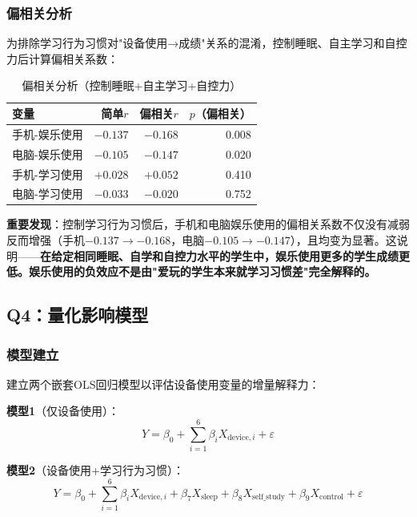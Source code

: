 \documentclass[11pt]{ctexart}
\begin{document}
\subsubsection{偏相关分析}

为排除学习行为习惯对"设备使用→成绩"关系的混淆，控制睡眠、自主学习和自控力后计算偏相关系数：

\begin{table}[H]
\centering
\caption{偏相关分析（控制睡眠+自主学习+自控力）}
\label{tab:partial}
\begin{tabular}{lrrr}
\toprule
变量 & 简单$r$ & 偏相关$r$ & $p$（偏相关）\\
\midrule
手机-娱乐使用 & $-0.137$ & $\mathbf{-0.168}$ & 0.008 \\
电脑-娱乐使用 & $-0.105$ & $\mathbf{-0.147}$ & 0.020 \\
手机-学习使用 & $+0.028$ & $+0.052$ & 0.410 \\
电脑-学习使用 & $-0.033$ & $-0.020$ & 0.752 \\
\bottomrule
\end{tabular}
\end{table}

\textbf{重要发现}：控制学习行为习惯后，手机和电脑娱乐使用的偏相关系数不仅没有减弱反而增强（手机$-0.137\to-0.168$，电脑$-0.105\to-0.147$），且均变为显著。这说明——\textbf{在给定相同睡眠、自学和自控力水平的学生中，娱乐使用更多的学生成绩更低。娱乐使用的负效应不是由"爱玩的学生本来就学习习惯差"完全解释的。}

\subsection{Q4：量化影响模型}

\subsubsection{模型建立}

建立两个嵌套OLS回归模型以评估设备使用变量的增量解释力：

\textbf{模型1}（仅设备使用）：
\begin{equation}
Y = \beta_0 + \sum_{i=1}^{6}\beta_i X_{\text{device},i} + \varepsilon
\end{equation}

\textbf{模型2}（设备使用+学习行为习惯）：
\begin{equation}
Y = \beta_0 + \sum_{i=1}^{6}\beta_i X_{\text{device},i} + \beta_7 X_{\text{sleep}} + \beta_8 X_{\text{self\_study}} + \beta_9 X_{\text{control}} + \varepsilon
\end{equation}
\end{document}
